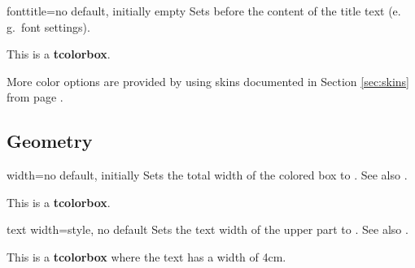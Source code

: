 \begin{docTcbKey}{fonttitle}{=}{no default, initially empty}
  Sets  before the content of the title text (e.\,g.\ font settings).
\begin{dispExample}
\begin{tcolorbox}[fonttitle=\sffamily\bfseries\large,title=Hello]
This is a \textbf{tcolorbox}.
\end{tcolorbox}
\end{dispExample}
\end{docTcbKey}

\bigskip
\begin{marker}
  More color options are provided by using skins documented in
  Section \ref{sec:skins} from page \pageref{sec:skins}.
\end{marker}

\clearpage
\subsection{Geometry}

\begin{docTcbKey}{width}{=}{no default, initially }
  Sets the total width of the colored box to .
  See also .
\begin{dispExample}

\begin{tcolorbox}[width=\linewidth/2]
This is a \textbf{tcolorbox}.
\end{tcolorbox}
\end{dispExample}
\end{docTcbKey}


\begin{docTcbKey}[][doc new=2014-10-31]{text width}{=}{style, no default}
  Sets the text width of the upper part to .
  See also .
\begin{dispExample}

\begin{tcolorbox}[text width=4cm]
This is a \textbf{tcolorbox} where the text has a width of 4cm.
\end{tcolorbox}
\end{dispExample}
\end{docTcbKey}

